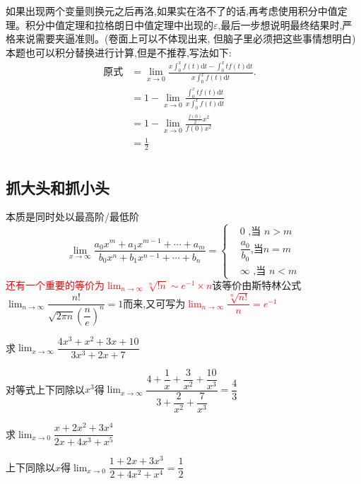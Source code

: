 \documentclass[9pt a4paper, oneside, UTF8]{ctexbook}
\begin{document}
\begin{sloppypar}
\begin{note}
        如果出现两个变量则换元之后再洛,如果实在洛不了的话,再考虑使用积分中值定理。积分中值定理和拉格朗日中值定理中出现的$\varepsilon$,最后一步想说明最终结果时,严格来说需要夹逼准则。(卷面上可以不体现出来, 但脑子里必须把这些事情想明白)\\
        本题也可以积分替换进行计算,但是不推荐,写法如下:
        \begin{align*}
             \text{原式} & = \lim_{x\to0}\frac{x\int_{0}^{x}f(t)\mathrm{d}t-\int_{0}^{x}tf\left(t\right)\mathrm{d}t}{x\!\int_{0}^{x}f(t)\mathrm{d}t}. & \\
             & = 1-\lim_{x\to0}\frac{\int_{0}^{x}tf\left(t\right)\mathrm{d}t}{x\int_{0}^{x}f\left(t\right)\mathrm{d}t} & \\
             & =1-\lim_{x\to0}\frac{\frac{f\left(0\right)}{2}x^{2}}{f\left(0\right)x^{2}} & \\
             & =\frac{1}{2} &\\
        \end{align*}
    \end{note}
    \subsection{抓大头和抓小头}
    本质是同时处以最高阶/最低阶
    $$
    \lim_{x\to\infty}\dfrac{a_0x^m+a_1x^{m-1}+\cdots+a_m}{b_0x^n+b_1x^{n-1}+\cdots+b_n}=\left.\left\{\begin{aligned}&0\text{ ,当 }n>m\\&\dfrac{a_0}{b_0}\text{,当}n=m\\&\infty\text{ ,当 }n<m\end{aligned}\right.\right.
    $$
    \textcolor{red}{还有一个重要的等价为$\lim_{n\to \infty}\sqrt[n]{!n}\sim e^{-1}\times n$}该等价由斯特林公式$\lim_{n\to\infty}\dfrac{n!}{\sqrt{2\pi n}\left(\dfrac ne\right)^n}=1$而来,又可写为\textcolor{red}{$\lim_{n\rightarrow\infty}\dfrac{\sqrt[n]{n!}}{n}=e^{-1}$}
    \begin{problem}
        求$\lim_{x\to \infty}\dfrac{4x^3+x^2+3x+10}{3x^3+2x+7}$
    \end{problem}
    \begin{solution}
        对等式上下同除以$x^3$得$\lim_{x \to \infty}\dfrac{4+\dfrac1x+\dfrac3{x^2}+\dfrac{10}{x^3}}{3+\dfrac2{x^2}+\dfrac7{x^3}}=\dfrac{4}{3}$
    \end{solution}
    \begin{problem}
        求$\lim_{x\to 0}\dfrac{x+2x^{2}+3x^{4}}{2x+4x^{3}+x^{5}}$
    \end{problem}
    \begin{solution}
        上下同除以$x$得$\lim_{x\to 0}\dfrac{1+2x+3x^{3}}{2+4x^{2}+x^{4}}=\dfrac{1}{2}$
    \end{solution}

\end{sloppypar}
\end{document}
